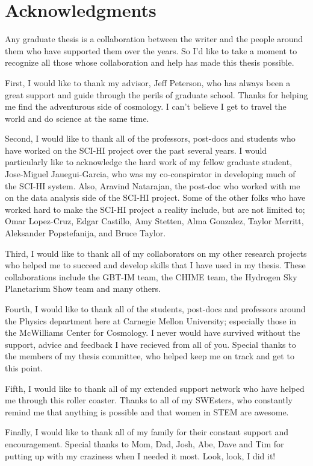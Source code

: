\section*{Acknowledgments}

Any graduate thesis is a collaboration between the writer and the people around them who have supported them over the years. So I'd like to take a moment to recognize all those whose collaboration and help has made this thesis possible. 

First, I would like to thank my advisor, Jeff Peterson, who has always been a great support and guide through the perils of graduate school. Thanks for helping me find the adventurous side of cosmology. I can't believe I get to travel the world and do science at the same time.

Second, I would like to thank all of the professors, post-docs and students who have worked on the SCI-HI project over the past several years. I would particularly like to acknowledge the hard work of my fellow graduate student, Jose-Miguel Jauegui-Garcia, who was my co-conspirator in developing much of the SCI-HI system. Also, Aravind Natarajan, the post-doc who worked with me on the data analysis side of the SCI-HI project. Some of the other folks who have worked hard to make the SCI-HI project a reality include, but are not limited to; Omar Lopez-Cruz, Edgar Castillo, Amy Stetten, Alma Gonzalez, Taylor Merritt, Aleksander Popstefanija, and Bruce Taylor. 

Third, I would like to thank all of my collaborators on my other research projects who helped me to succeed and develop skills that I have used in my thesis. These collaborations include the GBT-IM team, the CHIME team, the Hydrogen Sky Planetarium Show team and many others. 

Fourth, I would like to thank all of the students, post-docs and professors around the Physics department here at Carnegie Mellon University; especially those in the McWilliams Center for Cosmology. I never would have survived without the support, advice and feedback I have recieved from all of you. Special thanks to the members of my thesis committee, who helped keep me on track and get to this point. 

Fifth, I would like to thank all of my extended support network who have helped me through this roller coaster. Thanks to all of my SWEsters, who constantly remind me that anything is possible and that women in STEM are awesome. 

Finally, I would like to thank all of my family for their constant support and encouragement. Special thanks to Mom, Dad, Josh, Abe, Dave and Tim for putting up with my craziness when I needed it most. Look, look, I did it!

